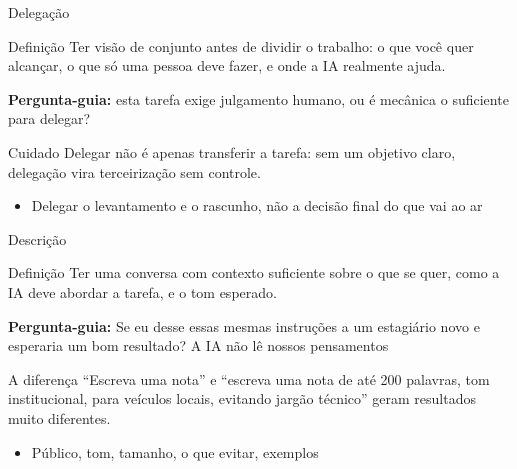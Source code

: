 \documentclass[aspectratio=169,11pt]{beamer}
\newcommand{\hl}[1]{\textcolor{terracota}{#1}}
\begin{document}
\begin{frame}{Delegação}
  \begin{notebox}{Definição}
    \small Ter visão de conjunto antes de dividir o trabalho: o que você quer alcançar, o que só uma pessoa deve fazer, e onde a IA realmente ajuda.
  \end{notebox}

  \textbf{Pergunta-guia:} esta tarefa exige julgamento humano, ou é mecânica o suficiente para delegar?

  \begin{alertbox}{Cuidado}
    \small Delegar não é apenas transferir a tarefa: sem um objetivo claro, delegação vira terceirização sem controle.
  \end{alertbox}

  \begin{itemize}
    \item Delegar o levantamento e o rascunho, não a decisão final do que vai ao ar
  \end{itemize}
\end{frame}

\begin{frame}{Descrição}
  \begin{notebox}{Definição}
    \small Ter uma conversa com contexto suficiente sobre o que se quer, como a IA deve abordar a tarefa, e o tom esperado.
  \end{notebox}
  \textbf{Pergunta-guia:} Se eu desse essas mesmas instruções a um estagiário novo e esperaria um bom resultado? \hl{A IA não lê nossos pensamentos}
  
  \begin{alertbox}{A diferença}
    \small ``Escreva uma nota'' e ``escreva uma nota de até 200 palavras, tom institucional, para veículos locais, evitando jargão técnico'' geram resultados muito diferentes.
  \end{alertbox}

  \begin{itemize}
    \item Público, tom, tamanho, o que evitar, exemplos 
  \end{itemize}
\end{frame} 
\end{document}
